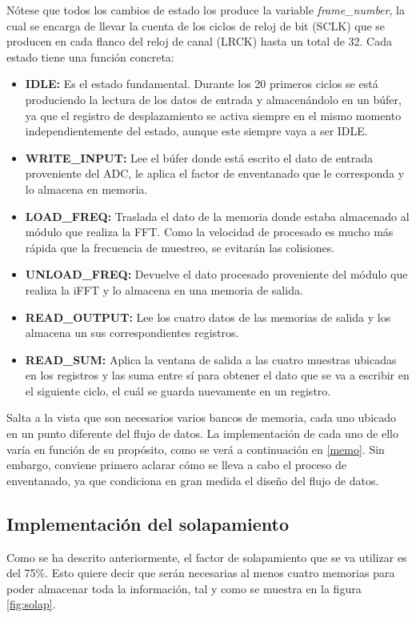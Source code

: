 Nótese que todos los cambios de estado los produce la variable \emph{frame\_number}, la cual se encarga de llevar la cuenta de los ciclos de reloj de bit (SCLK) que se producen en cada flanco del reloj de canal (LRCK) hasta un total de 32. Cada estado tiene una función concreta: 
\begin{itemize}
\item \textbf{IDLE:} Es el estado fundamental. Durante los 20 primeros ciclos se está produciendo la lectura de los datos de entrada y almacenándolo en un búfer, ya que el registro de desplazamiento se activa siempre en el mismo momento independientemente del estado, aunque este siempre vaya a ser IDLE.
\item \textbf{WRITE\_INPUT:} Lee el búfer donde está escrito el dato de entrada proveniente del ADC, le aplica el factor de enventanado que le corresponda y lo almacena en memoria.
\item \textbf{LOAD\_FREQ:} Traslada el dato de la memoria donde estaba almacenado al módulo que realiza la FFT. Como la velocidad de procesado es mucho más rápida que la frecuencia de muestreo, se evitarán las colisiones.
\item \textbf{UNLOAD\_FREQ:} Devuelve el dato procesado proveniente del módulo que realiza la iFFT y lo almacena en una memoria de salida.
\item \textbf{READ\_OUTPUT:} Lee los cuatro datos de las memorias de salida y los almacena un sus correspondientes registros.
\item \textbf{READ\_SUM:} Aplica la ventana de salida a las cuatro muestras ubicadas en los registros y las suma entre sí para obtener el dato que se va a escribir en el siguiente ciclo, el cuál se guarda nuevamente en un registro.
\end{itemize}

Salta a la vista que son necesarios varios bancos de memoria, cada uno ubicado en un punto diferente del flujo de datos. La implementación de cada uno de ello varía en función de su propósito, como se verá a continuación en \ref{memo}. Sin embargo, conviene primero aclarar cómo se lleva a cabo el proceso de enventanado, ya que condiciona en gran medida el diseño del flujo de datos.

\subsection{Implementación del solapamiento}
Como se ha descrito anteriormente, el factor de solapamiento que se va utilizar es del 75\%. Esto quiere decir que serán necesarias al menos cuatro memorias para poder almacenar toda la información, tal y como se muestra en la figura \ref{fig:solap}. 

